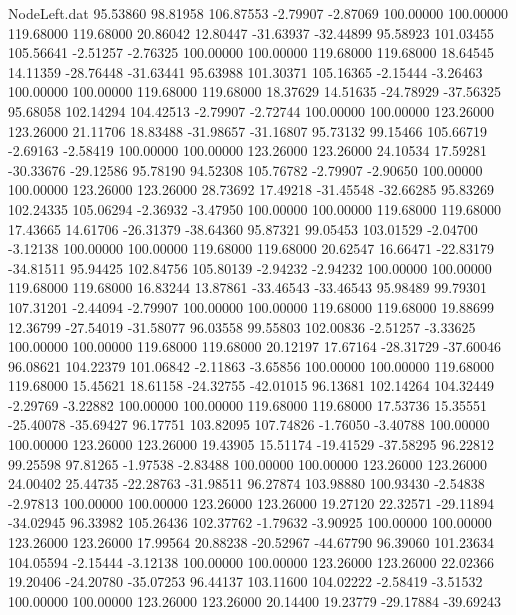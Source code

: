 \begin{filecontents}{NodeLeft.dat}
  95.53860   98.81958  106.87553    -2.79907   -2.87069  100.00000  100.00000  119.68000  119.68000   20.86042   12.80447  -31.63937  -32.44899
  95.58923  101.03455  105.56641    -2.51257   -2.76325  100.00000  100.00000  119.68000  119.68000   18.64545   14.11359  -28.76448  -31.63441
  95.63988  101.30371  105.16365    -2.15444   -3.26463  100.00000  100.00000  119.68000  119.68000   18.37629   14.51635  -24.78929  -37.56325
  95.68058  102.14294  104.42513    -2.79907   -2.72744  100.00000  100.00000  123.26000  123.26000   21.11706   18.83488  -31.98657  -31.16807
  95.73132   99.15466  105.66719    -2.69163   -2.58419  100.00000  100.00000  123.26000  123.26000   24.10534   17.59281  -30.33676  -29.12586
  95.78190   94.52308  105.76782    -2.79907   -2.90650  100.00000  100.00000  123.26000  123.26000   28.73692   17.49218  -31.45548  -32.66285
  95.83269  102.24335  105.06294    -2.36932   -3.47950  100.00000  100.00000  119.68000  119.68000   17.43665   14.61706  -26.31379  -38.64360
  95.87321   99.05453  103.01529    -2.04700   -3.12138  100.00000  100.00000  119.68000  119.68000   20.62547   16.66471  -22.83179  -34.81511
  95.94425  102.84756  105.80139    -2.94232   -2.94232  100.00000  100.00000  119.68000  119.68000   16.83244   13.87861  -33.46543  -33.46543
  95.98489   99.79301  107.31201    -2.44094   -2.79907  100.00000  100.00000  119.68000  119.68000   19.88699   12.36799  -27.54019  -31.58077
  96.03558   99.55803  102.00836    -2.51257   -3.33625  100.00000  100.00000  119.68000  119.68000   20.12197   17.67164  -28.31729  -37.60046
  96.08621  104.22379  101.06842    -2.11863   -3.65856  100.00000  100.00000  119.68000  119.68000   15.45621   18.61158  -24.32755  -42.01015
  96.13681  102.14264  104.32449    -2.29769   -3.22882  100.00000  100.00000  119.68000  119.68000   17.53736   15.35551  -25.40078  -35.69427
  96.17751  103.82095  107.74826    -1.76050   -3.40788  100.00000  100.00000  123.26000  123.26000   19.43905   15.51174  -19.41529  -37.58295
  96.22812   99.25598   97.81265    -1.97538   -2.83488  100.00000  100.00000  123.26000  123.26000   24.00402   25.44735  -22.28763  -31.98511
  96.27874  103.98880  100.93430    -2.54838   -2.97813  100.00000  100.00000  123.26000  123.26000   19.27120   22.32571  -29.11894  -34.02945
  96.33982  105.26436  102.37762    -1.79632   -3.90925  100.00000  100.00000  123.26000  123.26000   17.99564   20.88238  -20.52967  -44.67790
  96.39060  101.23634  104.05594    -2.15444   -3.12138  100.00000  100.00000  123.26000  123.26000   22.02366   19.20406  -24.20780  -35.07253
  96.44137  103.11600  104.02222    -2.58419   -3.51532  100.00000  100.00000  123.26000  123.26000   20.14400   19.23779  -29.17884  -39.69243

\end{filecontents}
